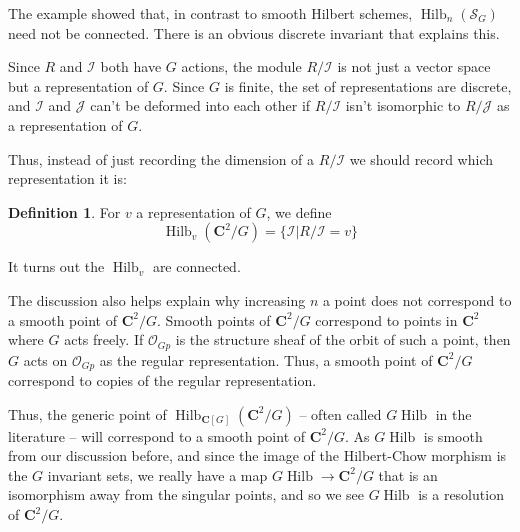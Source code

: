 \documentclass{amsart}[12pt]
\theoremstyle{definition}
\newtheorem{definition}[dummy]{Definition}
\newcommand{\C}{\mathbf{C}}
\newcommand{\II}{\mathcal{I}}
\newcommand{\Sur}{\mathcal{S}}
\DeclareMathOperator{\Hilb}{Hilb}
\begin{document}
The example showed that, in contrast to smooth Hilbert schemes, $\Hilb_n(\Sur_G)$ need not be connected.  There is an obvious discrete invariant that explains this.

 Since $R$ and $\II$ both have $G$ actions, the module $R/\II$ is not just a vector space but a representation of $G$.  Since $G$ is finite, the set of representations are discrete, and $\II$ and $\mathcal{J}$ can't be deformed into each other if $R/\II$ isn't isomorphic to $R/\mathcal{J}$ as a representation of $G$.  

Thus, instead of just recording the dimension of a $R/\II$ we should record which representation it is:

\begin{definition}
For $v$ a representation of $G$, we define
$$\Hilb_v(\C^2/G)=\{\II|R/\II=v\}$$
\end{definition}

It turns out the $\Hilb_v$ are connected.  





The discussion also helps explain why increasing $n$ a point does not correspond to a smooth point of $\C^2/G$.  Smooth points of $\C^2/G$ correspond to points in $\C^2$ where $G$ acts freely.  If $\mathcal{O}_{Gp}$ is the structure sheaf of the orbit of such a point, then $G$ acts on $\mathcal{O}_{Gp}$ as the regular representation.  Thus, a smooth point of $\C^2/G$ correspond to copies of the regular representation.

Thus, the generic point of $\Hilb_{\C[G]}({\C^2/G})$ -- often called $G\Hilb$ in the literature -- will correspond to a smooth point of $\C^2/G$.  As $G\Hilb$ is smooth from our discussion before, and since the image of the Hilbert-Chow morphism is the $G$ invariant sets, we really have a map $G\Hilb\to \C^2/G$ that is an isomorphism away from the singular points, and so we see $G\Hilb$ is a resolution of $\C^2/G$. 

\begin{center}
\end{center}
\end{document}
